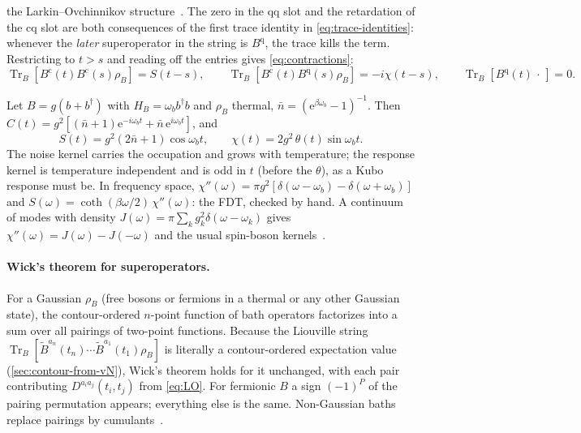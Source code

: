 \documentclass[11pt]{article}
\newcommand{\Tr}{\operatorname{Tr}}
\newcommand{\ee}{\mathrm{e}}
\newcommand{\cl}{\mathrm{c}}
\newcommand{\qu}{\mathrm{q}}
\newcommand{\rhoB}{\rho_{B}}
\begin{document}
the Larkin--Ovchinnikov structure~\cite{Kamenev2011,RammerSmith1986}. The zero in the
$\qu\qu$ slot and the retardation of the $\cl\qu$ slot are both consequences of the first
trace identity in \cref{eq:trace-identities}: whenever the \emph{later} superoperator in
the string is $B^\qu$, the trace kills the term. Restricting to $t>s$ and reading off the
entries gives \cref{eq:contractions}:
\begin{equation}
  \Tr_B[B^{\cl}(t)B^{\cl}(s)\rhoB]=S(t-s),\qquad
  \Tr_B[B^{\cl}(t)B^{\qu}(s)\rhoB]=-i\chi(t-s),\qquad
  \Tr_B[B^{\qu}(t)\,\cdot\,]=0 .
  \label{eq:contractions}
\end{equation}

\begin{keybox}
Let $B=g(b+b^\dagger)$ with $H_B=\omega_b b^\dagger b$ and $\rhoB$ thermal, $\bar n=(\ee^{\beta\omega_b}-1)^{-1}$.
Then $C(t)=g^2[(\bar n+1)\ee^{-i\omega_bt}+\bar n\,\ee^{i\omega_bt}]$, and
\begin{equation}
  S(t)=g^2(2\bar n+1)\cos\omega_bt,\qquad
  \chi(t)=2g^2\,\theta(t)\sin\omega_bt .
\end{equation}
The noise kernel carries the occupation and grows with temperature; the response kernel
is temperature independent and is odd in $t$ (before the $\theta$), as a Kubo response
must be. In frequency space, $\chi''(\omega)=\pi g^2[\delta(\omega-\omega_b)-\delta(\omega+\omega_b)]$ and
$S(\omega)=\coth(\beta\omega/2)\,\chi''(\omega)$: the FDT, checked by hand. A continuum of modes with
density $J(\omega)=\pi\sum_kg_k^2\delta(\omega-\omega_k)$ gives $\chi''(\omega)=J(\omega)-J(-\omega)$ and the usual spin-boson
kernels~\cite{Weiss2012}.
\end{keybox}

\paragraph{Wick's theorem for superoperators.}
For a Gaussian $\rhoB$ (free bosons or fermions in a thermal or any other Gaussian state),
the contour-ordered $n$-point function of bath operators factorizes into a sum over all
pairings of two-point functions. Because the Liouville string
$\Tr_B[\tilde B^{a_n}(t_n)\cdots\tilde B^{a_1}(t_1)\rhoB]$ is literally a contour-ordered
expectation value (\cref{sec:contour-from-vN}), Wick's theorem holds for it unchanged,
with each pair contributing $D^{a_ia_j}(t_i,t_j)$ from \cref{eq:LO}. For fermionic $B$ a sign
$(-1)^P$ of the pairing permutation appears; everything else is the same. Non-Gaussian
baths replace pairings by cumulants~\cite{Schoeller2009}.
\end{document}
